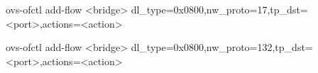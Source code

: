 \begin{itemize}
\begin{center}
ovs-ofctl add-flow <bridge> dl\_type=0x0800,nw\_proto=17,tp\_dst=<port>,actions=<action>
\end{center}

\begin{center}
ovs-ofctl add-flow <bridge> dl\_type=0x0800,nw\_proto=132,tp\_dst=<port>,actions=<action>
\end{center}









\end{itemize}
